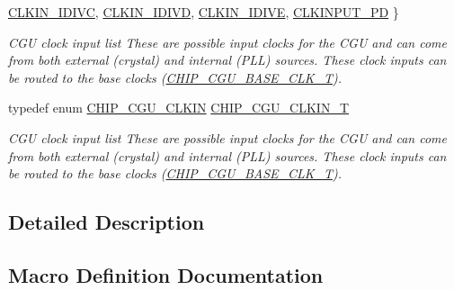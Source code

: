\begin{DoxyCompactItemize}
\hyperlink{group___c_l_o_c_k__18_x_x__43_x_x_gga419aa2b9970dcf4930eb44871da9e377ac08cb97457d4de7c50a9d775d26d7dcc}{C\+L\+K\+I\+N\+\_\+\+I\+D\+I\+VC}, 
\hyperlink{group___c_l_o_c_k__18_x_x__43_x_x_gga419aa2b9970dcf4930eb44871da9e377a4e433bee2205fdac865a7a9adb94d25a}{C\+L\+K\+I\+N\+\_\+\+I\+D\+I\+VD}, 
\newline
\hyperlink{group___c_l_o_c_k__18_x_x__43_x_x_gga419aa2b9970dcf4930eb44871da9e377a2f855e496263ba3d88be98f69cfc5640}{C\+L\+K\+I\+N\+\_\+\+I\+D\+I\+VE}, 
\hyperlink{group___c_l_o_c_k__18_x_x__43_x_x_gga419aa2b9970dcf4930eb44871da9e377a01c7e5b28a27ce99a5c68c0f4c701493}{C\+L\+K\+I\+N\+P\+U\+T\+\_\+\+PD}
 \}\begin{DoxyCompactList}\small\item\em C\+GU clock input list These are possible input clocks for the C\+GU and can come from both external (crystal) and internal (P\+LL) sources. These clock inputs can be routed to the base clocks (\hyperlink{chip__clocks_8h_a31e266dd83cc66eb866d8d051ffd1d45}{C\+H\+I\+P\+\_\+\+C\+G\+U\+\_\+\+B\+A\+S\+E\+\_\+\+C\+L\+K\+\_\+T}). \end{DoxyCompactList}
\item 
typedef enum \hyperlink{group___c_l_o_c_k__18_x_x__43_x_x_ga419aa2b9970dcf4930eb44871da9e377}{C\+H\+I\+P\+\_\+\+C\+G\+U\+\_\+\+C\+L\+K\+IN} \hyperlink{group___c_l_o_c_k__18_x_x__43_x_x_ga0975326707efebf2b074283e6c602f18}{C\+H\+I\+P\+\_\+\+C\+G\+U\+\_\+\+C\+L\+K\+I\+N\+\_\+T}
\begin{DoxyCompactList}\small\item\em C\+GU clock input list These are possible input clocks for the C\+GU and can come from both external (crystal) and internal (P\+LL) sources. These clock inputs can be routed to the base clocks (\hyperlink{chip__clocks_8h_a31e266dd83cc66eb866d8d051ffd1d45}{C\+H\+I\+P\+\_\+\+C\+G\+U\+\_\+\+B\+A\+S\+E\+\_\+\+C\+L\+K\+\_\+T}). \end{DoxyCompactList}\end{DoxyCompactItemize}


\subsection{Detailed Description}


\subsection{Macro Definition Documentation}
\mbox{\label{group___c_l_o_c_k__18_x_x__43_x_x_gaec3e2b28e900580cc4dc72034f7371fd}} 
